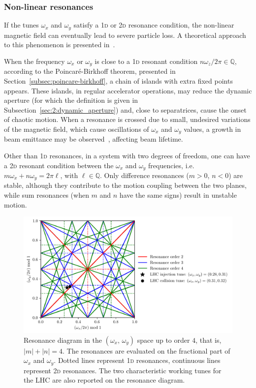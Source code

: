 \subsubsection{Non-linear resonances}

If the tunes $\omega_x$ and $\omega_y$ satisfy a 1\textsc{d} or 2\textsc{d} resonance condition, the non-linear magnetic field can eventually lead to severe particle loss. A theoretical approach to this phenomenon is presented in~\cite{Bazzani:262179, wilson}.

When the frequency $\omega_x$ or $\omega_y$ is close to a 1\textsc{d} resonant condition $n\omega_z / 2\pi \in \mathbb{Q}$, according to the Poincaré-Birkhoff theorem, presented in Section~\ref{subsec:poincare-birkhoff}, a chain of islands with extra fixed points appears. These islands, in regular accelerator operations, may reduce the dynamic aperture (for which the definition is given in Subsection~\ref{sec:2:dynamic_aperture}) and, close to separatrices, cause the onset of chaotic motion. When a resonance is crossed due to small, undesired variations of the magnetic field, which cause oscillations of $\omega_x$ and $\omega_y$ values, a growth in beam emittance may be observed~\cite{Guignard:185921}, affecting beam lifetime.

Other than 1\textsc{d} resonances, in a system with two degrees of freedom, one can have a 2\textsc{d} resonant condition between the $\omega_x$ and $\omega_y$ frequencies, i.e.\ $m\omega_x+n\omega_y = 2\pi\ell$, with $\ell \in \mathbb{Q}$. Only difference resonances ($m>0$, $n<0$) are stable, although they contribute to the motion coupling between the two planes, while sum resonances (when $m$ and $n$ have the same signs) result in unstable motion.

\begin{figure}
	\centering
	\includegraphics[width=.85\textwidth]{2_accelerator_physics_fundamentals/figs/tune_space.pdf}
	\caption{Resonance diagram in the $(\omega_x,\,\omega_y)$ space up to order $4$, that is, $|m|+|n| = 4$. The resonances are evaluated on the fractional part of $\omega_x$ and $\omega_y$. Dotted lines represent 1\textsc{d} resonances, continuous lines represent 2\textsc{d} resonances. The two characteristic working tunes for the LHC are also reported on the resonance diagram.}
	\label{fig:res}
\end{figure}

